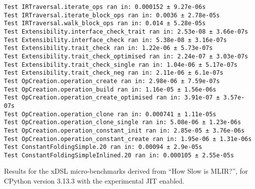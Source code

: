 \begin{code}
    \begin{verbatim}
Test IRTraversal.iterate_ops ran in: 0.000152 ± 9.27e-06s
Test IRTraversal.iterate_block_ops ran in: 0.0036 ± 2.78e-05s
Test IRTraversal.walk_block_ops ran in: 0.014 ± 5.28e-05s
Test Extensibility.interface_check_trait ran in: 2.53e-08 ± 3.66e-07s
Test Extensibility.interface_check ran in: 5.38e-08 ± 3.16e-07s
Test Extensibility.trait_check ran in: 1.22e-06 ± 5.73e-07s
Test Extensibility.trait_check_optimised ran in: 2.24e-07 ± 3.03e-07s
Test Extensibility.trait_check_single ran in: 1.04e-06 ± 5.17e-07s
Test Extensibility.trait_check_neg ran in: 2.11e-06 ± 6.1e-07s
Test OpCreation.operation_create ran in: 2.98e-06 ± 7.59e-07s
Test OpCreation.operation_build ran in: 1.16e-05 ± 1.56e-06s
Test OpCreation.operation_create_optimised ran in: 3.91e-07 ± 3.57e-07s
Test OpCreation.operation_clone ran in: 0.000741 ± 1.11e-05s
Test OpCreation.operation_clone_single ran in: 5.08e-06 ± 1.23e-06s
Test OpCreation.operation_constant_init ran in: 2.85e-05 ± 3.76e-06s
Test OpCreation.operation_constant_create ran in: 1.95e-06 ± 1.31e-06s
Test ConstantFoldingSimple.20 ran in: 0.00094 ± 2.9e-05s
Test ConstantFoldingSimpleInlined.20 ran in: 0.000105 ± 2.55e-05s
    \end{verbatim}
    \caption{Results for the xDSL micro-benchmarks derived from ``How Slow is MLIR?'', for CPython version 3.13.3 with the experimental JIT enabled.}
    \label{listing:how-slow-is-mlir-xdsl-microbenchmark-results-313jit}
\end{code}
